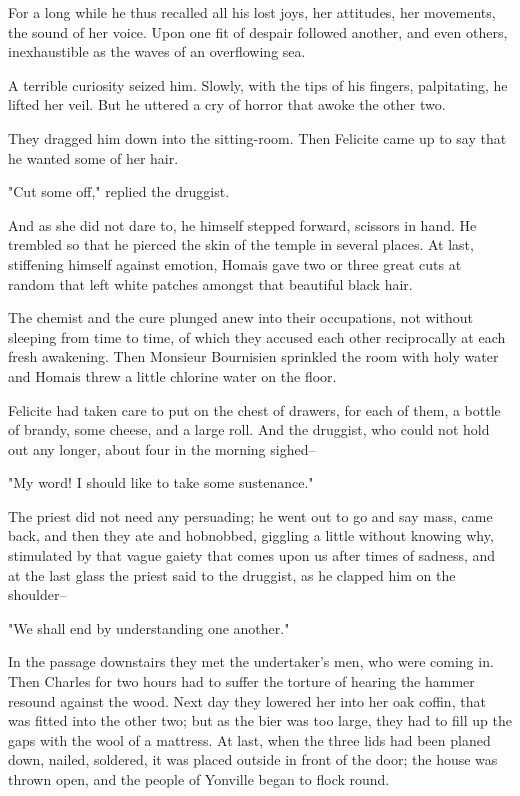 \documentclass{tufte-book}
\begin{document}
For a long while he thus recalled all his lost joys, her attitudes,
her movements, the sound of her voice. Upon one fit of despair followed
another, and even others, inexhaustible as the waves of an overflowing
sea.

A terrible curiosity seized him. Slowly, with the tips of his fingers,
palpitating, he lifted her veil. But he uttered a cry of horror that
awoke the other two.

They dragged him down into the sitting-room. Then Felicite came up to
say that he wanted some of her hair.

"Cut some off," replied the druggist.

And as she did not dare to, he himself stepped forward, scissors in
hand. He trembled so that he pierced the skin of the temple in several
places. At last, stiffening himself against emotion, Homais gave two
or three great cuts at random that left white patches amongst that
beautiful black hair.

The chemist and the cure plunged anew into their occupations, not
without sleeping from time to time, of which they accused each other
reciprocally at each fresh awakening. Then Monsieur Bournisien sprinkled
the room with holy water and Homais threw a little chlorine water on the
floor.

Felicite had taken care to put on the chest of drawers, for each
of them, a bottle of brandy, some cheese, and a large roll. And the
druggist, who could not hold out any longer, about four in the morning
sighed--

"My word! I should like to take some sustenance."

The priest did not need any persuading; he went out to go and say mass,
came back, and then they ate and hobnobbed, giggling a little without
knowing why, stimulated by that vague gaiety that comes upon us after
times of sadness, and at the last glass the priest said to the druggist,
as he clapped him on the shoulder--

"We shall end by understanding one another."

In the passage downstairs they met the undertaker's men, who were coming
in. Then Charles for two hours had to suffer the torture of hearing the
hammer resound against the wood. Next day they lowered her into her
oak coffin, that was fitted into the other two; but as the bier was
too large, they had to fill up the gaps with the wool of a mattress. At
last, when the three lids had been planed down, nailed, soldered, it was
placed outside in front of the door; the house was thrown open, and the
people of Yonville began to flock round.
\end{document}
